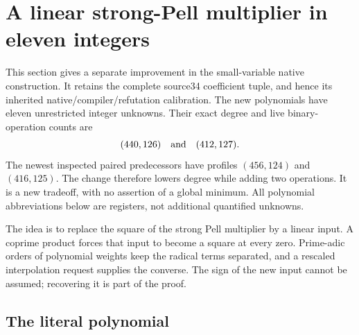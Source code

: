 \section{A linear strong-Pell multiplier in eleven integers}
\label{sec:linear-multiplier}

This section gives a separate improvement in the small-variable native
construction. It retains the complete source34 coefficient tuple, and hence
its inherited native/compiler/refutation calibration. The new polynomials
have eleven unrestricted integer unknowns. Their exact degree and live
binary-operation counts are
\[
  (440,126)\quad\hbox{and}\quad(412,127).
\]
The newest inspected paired predecessors have profiles $(456,124)$ and
$(416,125)$. The change therefore lowers degree while adding two operations.
It is a new tradeoff, with no assertion of a global minimum. All polynomial
abbreviations below are registers, not additional quantified unknowns.

The idea is to replace the square of the strong Pell multiplier by a linear
input. A coprime product forces that input to become a square at every zero.
Prime-adic orders of polynomial weights keep the radical terms separated, and a
rescaled interpolation request supplies the converse. The sign of the new
input cannot be assumed; recovering it is part of the proof.

\subsection{The literal polynomial}

